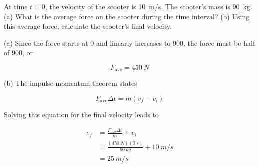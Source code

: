 \documentclass[]{exam}
\begin{document}
\begin{questions}
At time $t=0$, the velocity of the scooter is \SI{10}{m/s}. The scooter's mass is \SI{90}{kg}. (a) What is the average force on the scooter during the time interval? (b) Using this average force, calculate the scooter's final velocity.


\begin{solutionorbox}[6cm]
    (a) Since the force starts at 0 and linearly increases to 900, the force must be half of 900, or

    \begin{equation*}
        F_\text{ave} = \SI{450}{N}
    \end{equation*}

(b) The impulse-momentum theorem states

\begin{equation*}
    F_\text{ave} \Delta t = m (v_f - v_i)
\end{equation*}

Solving this equation for the final velocity leads to

\begin{align*}
    v_f &= \frac{F_\text{ave} \Delta t}{m} + v_i \\[1ex]
        &= \frac{(\SI{450}{N})(\SI{3}{s})}{\SI{90}{kg}} + \SI{10}{m/s} \\[1ex]
        &= \boxed{\SI{25}{m/s}}
\end{align*}
\end{solutionorbox}

\fi



\end{questions}
\end{document}
